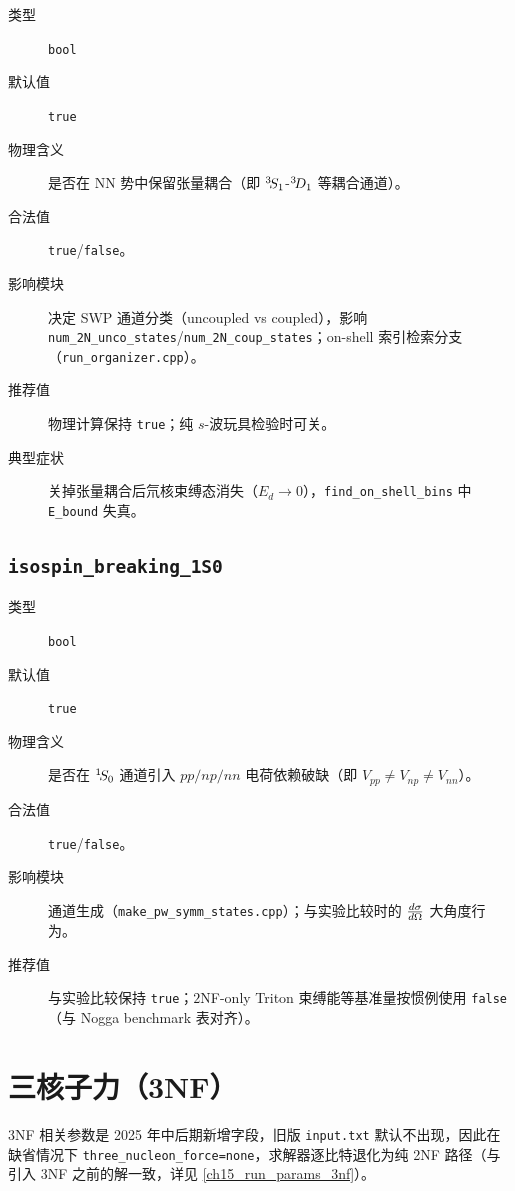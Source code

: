 \begin{description}
  \item[类型] \texttt{bool}
  \item[默认值] \texttt{true}
  \item[物理含义] 是否在 NN 势中保留张量耦合（即 \({}^{3}\!S_{1}\)-\({}^{3}\!D_{1}\) 等耦合通道）。
  \item[合法值] \texttt{true}/\texttt{false}。
  \item[影响模块] 决定 SWP 通道分类（uncoupled vs coupled），影响 \texttt{num\_2N\_unco\_states}/\texttt{num\_2N\_coup\_states}；on-shell 索引检索分支（\texttt{run\_organizer.cpp}）。
  \item[推荐值] 物理计算保持 \texttt{true}；纯 \(s\)-波玩具检验时可关。
  \item[典型症状] 关掉张量耦合后氘核束缚态消失（\(E_d\to 0\)），\texttt{find\_on\_shell\_bins} 中 \texttt{E\_bound} 失真。
\end{description}

\subsection{\texttt{isospin\_breaking\_1S0}}

\begin{description}
  \item[类型] \texttt{bool}
  \item[默认值] \texttt{true}
  \item[物理含义] 是否在 \({}^{1}\!S_{0}\) 通道引入 \(pp/np/nn\) 电荷依赖破缺（即 \(V_{pp}\ne V_{np}\ne V_{nn}\)）。
  \item[合法值] \texttt{true}/\texttt{false}。
  \item[影响模块] 通道生成（\texttt{make\_pw\_symm\_states.cpp}）；与实验比较时的 \(\frac{d\sigma}{d\Omega}\) 大角度行为。
  \item[推荐值] 与实验比较保持 \texttt{true}；\(2\)NF-only Triton 束缚能等基准量按惯例使用 \texttt{false}（与 Nogga benchmark 表对齐）。
\end{description}

\section{三核子力（3NF）}
\label{sec:appE_threenf}

3NF 相关参数是 2025 年中后期新增字段，旧版 \texttt{input.txt} 默认不出现，因此在缺省情况下 \texttt{three\_nucleon\_force=none}，求解器逐比特退化为纯 2NF 路径（与
引入 3NF 之前的解一致，详见 \cref{ch15_run_params_3nf}）。


